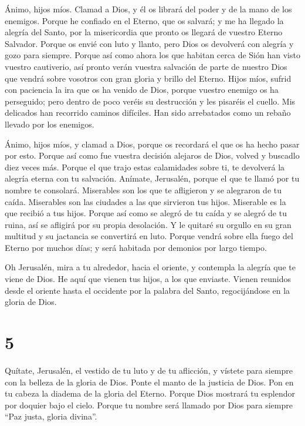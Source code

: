  Ánimo, hijos míos. Clamad a Dios, y él os librará del
poder y de la mano de los enemigos.  Porque he confiado
en el Eterno, que os salvará; y me ha llegado la alegría del Santo, por
la misericordia que pronto os llegará de vuestro Eterno Salvador.
 Porque os envié con luto y llanto, pero Dios os
devolverá con alegría y gozo para siempre.  Porque así
como ahora los que habitan cerca de Sión han visto vuestro cautiverio,
así pronto verán vuestra salvación de parte de nuestro Dios que vendrá
sobre vosotros con gran gloria y brillo del Eterno. 
Hijos míos, sufrid con paciencia la ira que os ha venido de Dios, porque
vuestro enemigo os ha perseguido; pero dentro de poco veréis su
destrucción y les pisaréis el cuello.  Mis delicados han
recorrido caminos difíciles. Han sido arrebatados como un rebaño llevado
por los enemigos.

 Ánimo, hijos míos, y clamad a Dios, porque os recordará
el que os ha hecho pasar por esto.  Porque así como fue
vuestra decisión alejaros de Dios, volved y buscadlo diez veces más.
 Porque el que trajo estas calamidades sobre ti, te
devolverá la alegría eterna con tu salvación.  Anímate,
Jerusalén, porque el que te llamó por tu nombre te consolará.
 Miserables son los que te afligieron y se alegraron de
tu caída.  Miserables son las ciudades a las que
sirvieron tus hijos. Miserable es la que recibió a tus hijos.
 Porque así como se alegró de tu caída y se alegró de tu
ruina, así se afligirá por su propia desolación.  Y le
quitaré su orgullo en su gran multitud y su jactancia se convertirá en
luto.  Porque vendrá sobre ella fuego del Eterno por
muchos días; y será habitada por demonios por largo tiempo.

 Oh Jerusalén, mira a tu alrededor, hacia el oriente, y
contempla la alegría que te viene de Dios.  He aquí que
vienen tus hijos, a los que enviaste. Vienen reunidos desde el oriente
hasta el occidente por la palabra del Santo, regocijándose en la gloria
de Dios.

\hypertarget{section-4}{%
\section{5}\label{section-4}}

 Quítate, Jerusalén, el vestido de tu luto y de tu
aflicción, y vístete para siempre con la belleza de la gloria de Dios.
 Ponte el manto de la justicia de Dios. Pon en tu cabeza
la diadema de la gloria del Eterno.  Porque Dios mostrará
tu esplendor por doquier bajo el cielo.  Porque tu nombre
será llamado por Dios para siempre ``Paz justa, gloria divina''.

